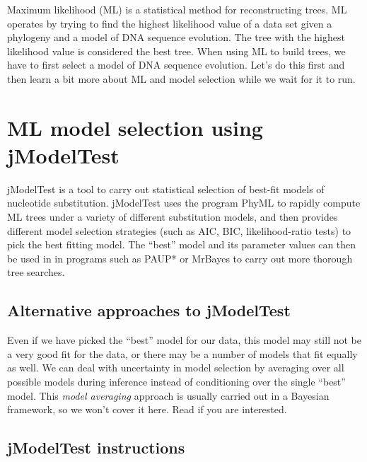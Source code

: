\documentclass[11pt]{article}
\begin{document}
Maximum likelihood (ML) is a statistical method for reconstructing trees.  
ML operates by trying to find the highest
likelihood value of a data set given a phylogeny and a model of DNA sequence evolution.
The tree with the highest likelihood value is considered the best tree.  
When using ML to build trees, 
we have to first select a model of DNA sequence evolution. 
Let's do this first and then learn a bit more about ML and model selection while we wait for it to run.

\section{ML model selection using jModelTest}

jModelTest \citep{darriba2012jmodeltest} is a tool to carry out statistical selection of best-fit models of nucleotide substitution.
jModelTest uses the program PhyML \citep{guindon2010new}
to rapidly compute ML trees under a variety of different substitution models,
and then provides different model selection strategies (such as AIC, BIC, likelihood-ratio tests)
to pick the best fitting model.
The ``best'' model and its parameter values can then be used in 
in programs such as PAUP* or MrBayes to carry out more thorough tree searches.

\subsection{Alternative approaches to jModelTest}

Even if we have picked the ``best'' model for our data, this model may still not be a very good
fit for the data, or there may be a number of models that fit equally as well.
We can deal with uncertainty in model selection by averaging over all possible
models during inference instead of conditioning over the single ``best'' model.
This \textit{model averaging} approach is usually carried out in a Bayesian framework,
so we won't cover it here. Read \citet{huelsenbeck2004bayesian} if you are interested.

\subsection{jModelTest instructions}
\end{document}
